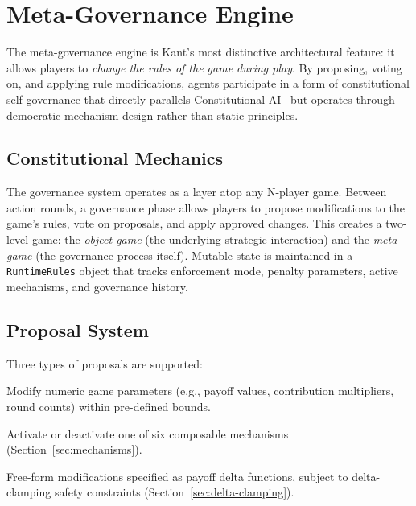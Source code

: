 
\section{Meta-Governance Engine}
\label{sec:governance}

The meta-governance engine is Kant's most distinctive architectural feature:
it allows players to \emph{change the rules of the game during play}. By
proposing, voting on, and applying rule modifications, agents participate in
a form of constitutional self-governance that directly parallels Constitutional
AI~\citep{bai2022constitutional} but operates through democratic mechanism
design rather than static principles.

\subsection{Constitutional Mechanics}
\label{sec:constitutional}

The governance system operates as a layer atop any N-player game. Between
action rounds, a governance phase allows players to propose modifications to
the game's rules, vote on proposals, and apply approved changes. This creates
a two-level game: the \emph{object game} (the underlying strategic interaction)
and the \emph{meta-game} (the governance process itself). Mutable state is
maintained in a \texttt{RuntimeRules} object that tracks enforcement mode,
penalty parameters, active mechanisms, and governance history.

\subsection{Proposal System}
\label{sec:proposals}

Three types of proposals are supported:

\begin{description}[nosep]
    \item[Parameter Proposals.] Modify numeric game parameters (e.g., payoff
        values, contribution multipliers, round counts) within pre-defined
        bounds.
    \item[Mechanic Proposals.] Activate or deactivate one of six composable
        mechanisms (Section~\ref{sec:mechanisms}).
    \item[Custom Proposals.] Free-form modifications specified as payoff
        delta functions, subject to delta-clamping safety constraints
        (Section~\ref{sec:delta-clamping}).
\end{description}

